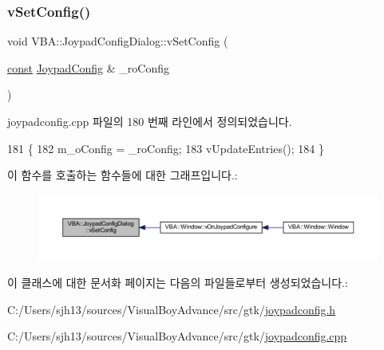 \subsubsection{\texorpdfstring{v\+Set\+Config()}{vSetConfig()}}
{\footnotesize\ttfamily void V\+B\+A\+::\+Joypad\+Config\+Dialog\+::v\+Set\+Config (\begin{DoxyParamCaption}\item[{\mbox{\hyperlink{getopt1_8c_a2c212835823e3c54a8ab6d95c652660e}{const}} \mbox{\hyperlink{class_v_b_a_1_1_joypad_config}{Joypad\+Config}} \&}]{\+\_\+ro\+Config }\end{DoxyParamCaption})}



joypadconfig.\+cpp 파일의 180 번째 라인에서 정의되었습니다.


\begin{DoxyCode}
181 \{
182   m\_oConfig = \_roConfig;
183   vUpdateEntries();
184 \}
\end{DoxyCode}
이 함수를 호출하는 함수들에 대한 그래프입니다.\+:
\nopagebreak
\begin{figure}[H]
\begin{center}
\leavevmode
\includegraphics[width=350pt]{class_v_b_a_1_1_joypad_config_dialog_a287e47a32aec963efaa309b8f031268b_icgraph}
\end{center}
\end{figure}


이 클래스에 대한 문서화 페이지는 다음의 파일들로부터 생성되었습니다.\+:\begin{DoxyCompactItemize}
\item 
C\+:/\+Users/sjh13/sources/\+Visual\+Boy\+Advance/src/gtk/\mbox{\hyperlink{joypadconfig_8h}{joypadconfig.\+h}}\item 
C\+:/\+Users/sjh13/sources/\+Visual\+Boy\+Advance/src/gtk/\mbox{\hyperlink{joypadconfig_8cpp}{joypadconfig.\+cpp}}\end{DoxyCompactItemize}
